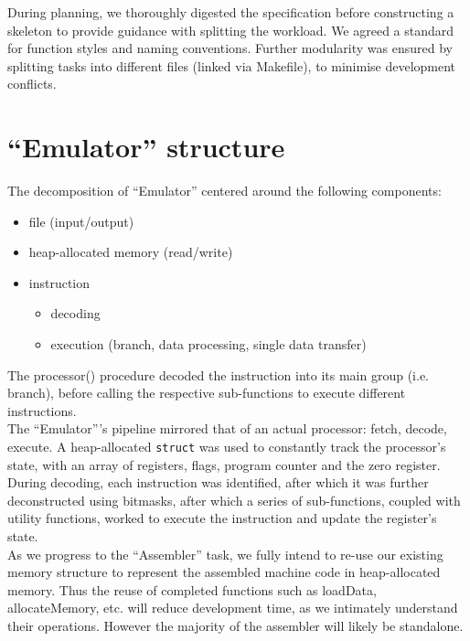 \documentclass[11pt]{article}
\begin{document}
During planning, we thoroughly digested the specification before constructing a skeleton to provide guidance with splitting the workload. We agreed a standard for function styles and naming conventions. Further modularity was ensured by splitting tasks into different files (linked via Makefile), to minimise development conflicts. \\
\pagebreak
\section{“Emulator” structure}
The decomposition of “Emulator” centered around the following components:
\begin{itemize}
\item  file (input/output)
    \item heap-allocated memory (read/write)
    \item instruction
    \begin{itemize}
        \item decoding
        \item execution (branch, data processing, single data transfer)
    \end{itemize}
\end{itemize}

The processor() procedure decoded the instruction into its main group (i.e. branch), before calling the respective sub-functions to execute different instructions. \\

The “Emulator”'s pipeline mirrored that of an actual processor: fetch, decode, execute. A heap-allocated \lstinline{struct} was used to constantly track the processor's state, with an array of registers,  flags, program counter and the zero register.  \\

During decoding, each instruction was identified, after which it was further deconstructed using bitmasks, after which a series of sub-functions, coupled with utility functions, worked to execute the instruction and update the register's state. \\

As we progress to the “Assembler” task, we fully intend to re-use our existing memory structure to represent the assembled machine code in heap-allocated memory. Thus the reuse of completed functions such as loadData, allocateMemory, etc. will reduce development time, as we intimately understand their operations. However the majority of the assembler will likely be standalone.
\\
\end{document}
